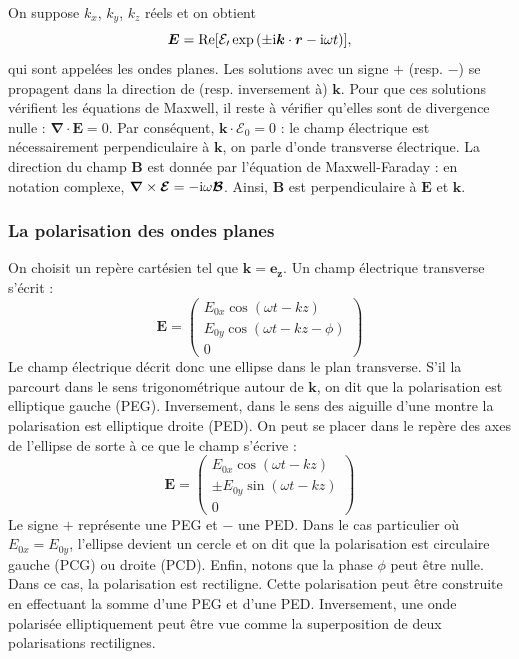 On suppose $k_x$, $k_y$, $k_z$ réels et on obtient 
\begin{equation*}
\bm{E}=\text{Re}[\mathcal{E_0}\exp{(\pm\mathrm{i}\bm{k}\cdot\bm{r}-\mathrm{i}\omega t)}],
\end{equation*}
qui sont appelées les ondes planes. Les solutions avec un signe $+$ (resp. $-$) se propagent dans la direction de (resp. inversement à) $\bm{k}$. Pour que ces solutions vérifient les équations de Maxwell, il reste à vérifier qu'elles sont de divergence nulle : $\bm{\nabla}\cdot\bm{E} = 0$. Par conséquent, $\bm{k}\cdot\bm{\mathcal{E_0}}= 0$ : le champ électrique est nécessairement perpendiculaire à $\bm{k}$, on parle d'onde transverse électrique. La direction du champ $\bm{B}$ est donnée par l'équation de Maxwell-Faraday : en notation complexe, $\bm{\nabla}\times\bm{\mathcal{E}}=-\mathrm{i}\omega\bm{\mathcal{B}}$. Ainsi, $\bm{B}$ est perpendiculaire à $\bm{E}$ et $\bm{k}$.

\subsubsection{La polarisation des ondes planes}
On choisit un repère cartésien tel que $\bm{k}=\bm{e_z}$. Un champ électrique transverse s'écrit :
\begin{equation*}
\bm{E}=\begin{pmatrix}
E_{0x}\cos{(\omega t-kz)}\\
E_{0y}\cos{(\omega t-kz-\phi)}\\
0
\end{pmatrix}
\end{equation*}
Le champ électrique décrit donc une ellipse dans le plan transverse. S'il la parcourt dans le sens trigonométrique autour de $\bm{k}$, on dit que la polarisation est elliptique gauche (PEG). Inversement, dans le sens des aiguille d'une montre la polarisation est elliptique droite (PED). On peut se placer dans le repère des axes de l'ellipse de sorte à ce que le champ s'écrive :
\begin{equation*}
\bm{E}=\begin{pmatrix}
E_{0x}\cos{(\omega t-kz)}\\
\pm E_{0y}\sin{(\omega t-kz)}\\
0
\end{pmatrix}
\end{equation*}
Le signe $+$ représente une PEG et $-$ une PED. Dans le cas particulier où $E_{0x}=E_{0y}$, l'ellipse devient un cercle et on dit que la polarisation est circulaire gauche (PCG) ou droite (PCD). Enfin, notons que la phase $\phi$ peut être nulle. Dans ce cas, la polarisation est rectiligne. Cette polarisation peut être construite en effectuant la somme d'une PEG et d'une PED. Inversement, une onde polarisée elliptiquement peut être vue comme la superposition de deux polarisations rectilignes.


